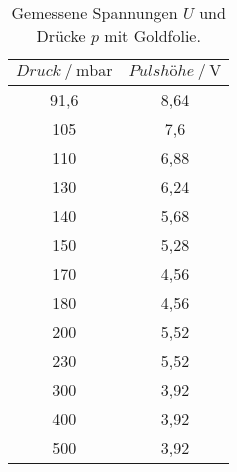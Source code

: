 \begin{table}[H] 
   \centering 
   \caption{Gemessene Spannungen $U$ und Drücke $p$ mit Goldfolie.} 
   \label{tab:mit} 
   \begin{tabular} { c c } 
 \toprule 
 {$Druck\:/\: \mathrm{mbar}$} & {$Pulshöhe\:/\: \mathrm{V}$} \\ 
    \midrule 
    91,6 & 8,64 \\ 
    105 & 7,6 \\ 
    110 & 6,88 \\ 
    130 & 6,24 \\ 
    140 & 5,68 \\ 
    150 & 5,28 \\ 
    170 & 4,56 \\ 
    180 & 4,56 \\ 
    200 & 5,52 \\ 
    230 & 5,52 \\ 
    300 & 3,92 \\ 
    400 & 3,92 \\ 
    500 & 3,92 \\ 
    \bottomrule 
  \end{tabular}
\end{table}